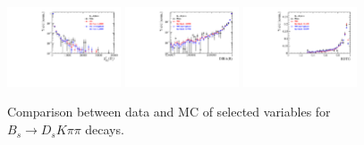 \begin{figure}[h]
\includegraphics[height=!,width=0.3\textwidth]{figs/dataVsMC/signal_final/combined/Ds2KKpi_1_Ds_FDCHI2_ORIVX.pdf}
\includegraphics[height=!,width=0.3\textwidth]{figs/dataVsMC/signal_final/combined/Ds2KKpi_1_Bs_DIRA_OWNPV.pdf}
\includegraphics[height=!,width=0.3\textwidth]{figs/dataVsMC/signal_final/combined/Ds2KKpi_1_BDTG_response.pdf}

%
%
%
%

\caption{\footnotesize Comparison between data and MC of  selected variables for $B_s\to D_sK\pi\pi$ decays.}
\label{fig:}
\end{figure}
%
